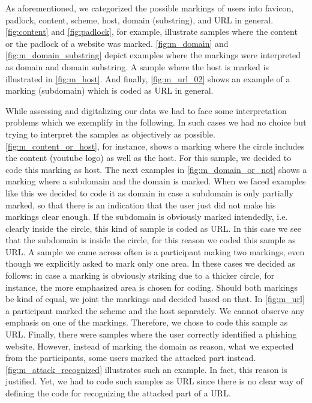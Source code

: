 \begin{description}[leftmargin=0cm]
	\item[Marking Interpretation Examples] As aforementioned, we categorized the possible markings of users into favicon, padlock, content, scheme, host, domain (substring), and URL in general.
\autoref{fig:content} and \autoref{fig:padlock}, for example, illustrate samples where the content or the padlock of a website was marked.
\autoref{fig:m_domain} and \autoref{fig:m_domain_substring} depict examples where the markings were interpreted as domain and domain substring.
A sample where the host is marked is illustrated in \autoref{fig:m_host}.
And finally, \autoref{fig:m_url_02} shows an example of a marking (subdomain) which is coded as URL in general. 

	\item[Interpretation Problem Examples] While assessing and digitalizing our data we had to face some interpretation problems which we exemplify in the following.
In such cases we had no choice but trying to interpret the samples as objectively as possible.
\autoref{fig:m_content_or_host}, for instance, shows a marking where the circle includes the content (youtube logo) as well as the host. 
For this sample, we decided to code this marking as host.
The next examples in \autoref{fig:m_domain_or_not} shows a marking where a subdomain and the domain is marked. 
When we faced examples like this we decided to code it as domain in case a subdomain is only partially marked, so that there is an indication that the user just did not make his markings clear enough.
If the subdomain is obviously marked intendedly, i.e. clearly inside the circle, this kind of sample is coded as URL.
In this case we see that the subdomain is inside the circle, for this reason we coded this sample as URL.
A sample we came across often is a participant making two markings, even though we explicitly asked to mark only one area.
In these cases we decided as follows: in case a marking is obviously striking due to a thicker circle, for instance, the more emphasized area is chosen for coding.
Should both markings be kind of equal, we joint the markings and decided based on that.
In \autoref{fig:m_url} a participant marked the scheme and the host separately. 
We cannot observe any emphasis on one of the markings.
Therefore, we chose to code this sample as URL.
Finally, there were samples where the user correctly identified a phishing website.
However, instead of marking the domain as reason, what we expected from the participants, some users marked the attacked part instead.
\autoref{fig:m_attack_recognized} illustrates such an example.
In fact, this reason is justified. 
Yet, we had to code such samples as URL since there is no clear way of defining the code for recognizing the attacked part of a URL.
\end{description}

